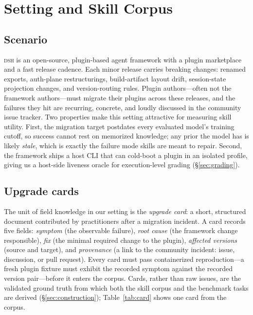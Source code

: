 \documentclass[11pt]{article}
\newcommand{\framework}{\textsc{dsh}}
\begin{document}
\section{Setting and Skill Corpus}

\subsection{Scenario}
\label{sec:scenario}

\framework{} is an open-source, plugin-based agent framework with a plugin marketplace and a fast release cadence.
Each minor release carries breaking changes: renamed exports, auth-plane restructurings, build-artifact layout drift, session-state projection changes, and version-routing rules.
Plugin authors---often not the framework authors---must migrate their plugins across these releases, and the failures they hit are recurring, concrete, and loudly discussed in the community issue tracker.
Two properties make this setting attractive for measuring skill utility.
First, the migration target postdates every evaluated model's training cutoff, so success cannot rest on memorized knowledge; any prior the model has is likely \emph{stale}, which is exactly the failure mode skills are meant to repair.
Second, the framework ships a host CLI that can cold-boot a plugin in an isolated profile, giving us a host-side liveness oracle for execution-level grading (\S\ref{sec:grading}).

\subsection{Upgrade cards}
\label{sec:cards}

The unit of field knowledge in our setting is the \emph{upgrade card}: a short, structured document contributed by practitioners after a migration incident.
A card records five fields: \emph{symptom} (the observable failure), \emph{root cause} (the framework change responsible), \emph{fix} (the minimal required change to the plugin), \emph{affected versions} (source and target), and \emph{provenance} (a link to the community incident: issue, discussion, or pull request).
Every card must pass containerized reproduction---a fresh plugin fixture must exhibit the recorded symptom against the recorded version pair---before it enters the corpus.
Cards, rather than raw issues, are the validated ground truth from which both the skill corpus and the benchmark tasks are derived (\S\ref{sec:construction}); Table~\ref{tab:card} shows one card from the corpus.
\end{document}
